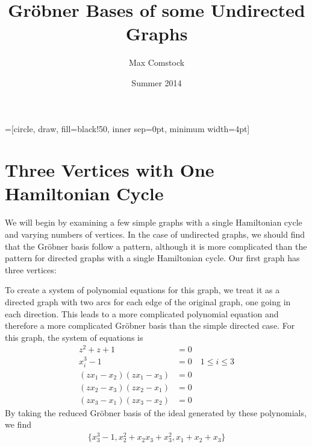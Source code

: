 \documentclass[letterpaper]{article}
\newcommand{\aln}[1]{\begin{align*} #1 \end{align*}} %
\begin{document}
=[circle, draw, fill=black!50, inner sep=0pt, minimum width=4pt]

\title{Gr\"obner Bases of some Undirected Graphs}
\author{Max Comstock}
\date{Summer 2014}
\maketitle

\section{Three Vertices with One Hamiltonian Cycle}
We will begin by examining a few simple graphs with a single Hamiltonian cycle and varying numbers of vertices. In the case of undirected graphs, we should find that the Gr\"obner basis follow a pattern, although it is more complicated than the pattern for directed graphs with a single Hamiltonian cycle. Our first graph has three vertices:
\begin{center}
\end{center}
To create a system of polynomial equations for this graph, we treat it as a directed graph with two arcs for each edge of the original graph, one going in each direction. This leads to a more complicated polynomial equation and therefore a more complicated Gr\"obner basis than the simple directed case. For this graph, the system of equations is
\aln{
  z^2 + z + 1 &= 0\\
  x_i^3 - 1 &= 0 \quad 1 \leq i \leq 3\\
  (z x_1 - x_2) (z x_1 - x_3) &= 0\\
  (z x_2 - x_3) (z x_2 - x_1) &= 0\\
  (z x_3 - x_1) (z x_3 - x_2) &= 0
}
By taking the reduced Gr\"obner basis of the ideal generated by these polynomials, we find
\aln{
  \{x_3^3-1, x_2^2+x_2x_3+x_3^2, x_1+x_2+x_3\}
}

\newpage
\end{document}
